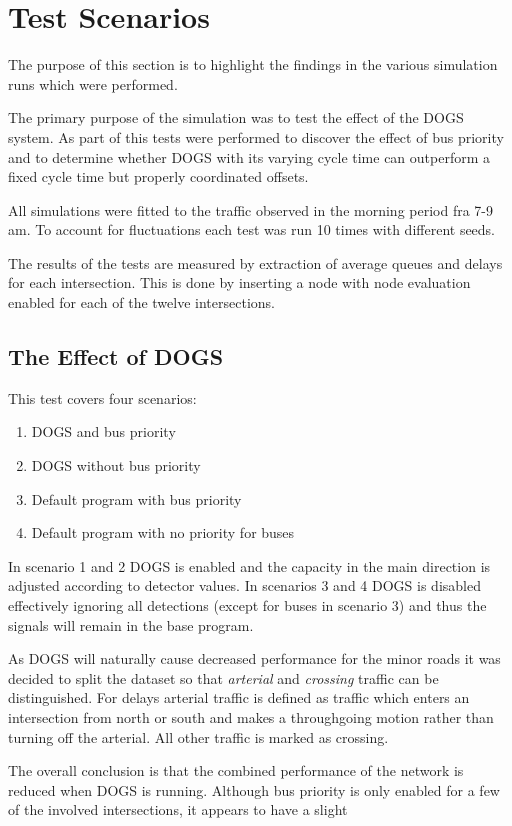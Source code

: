 \section{Test Scenarios}
The purpose of this section is to highlight the findings in the various simulation runs which were performed.

The primary purpose of the simulation was to test the effect of the DOGS system. 
As part of this tests were performed to discover the effect of bus priority and to determine whether DOGS with its varying cycle time can outperform a fixed cycle time but properly coordinated offsets.

All simulations were fitted to the traffic observed in the morning period fra 7-9 am.
To account for fluctuations each test was run 10 times with different seeds.

The results of the tests are measured by extraction of average queues and delays for each intersection. This is done by inserting a node with node evaluation enabled for each of the twelve intersections.

\subsection{The Effect of DOGS}
This test covers four scenarios:

\begin{enumerate}
\item DOGS and bus priority
\item DOGS without bus priority
\item Default program with bus priority
\item Default program with no priority for buses
\end{enumerate}

In scenario 1 and 2 DOGS is enabled and the capacity in the main direction is adjusted according to detector values. In scenarios 3 and 4 DOGS is disabled effectively ignoring all detections (except for buses in scenario 3) and thus the signals will remain in the base program.

As DOGS will naturally cause decreased performance for the minor roads it was decided to split the dataset so that \textit{arterial} and \textit{crossing} traffic can be distinguished. For delays arterial traffic is defined as traffic which enters an intersection from north or south and makes a throughgoing motion rather than turning off the arterial. All other traffic is marked as crossing.

The overall conclusion is that the combined performance of the network is reduced when DOGS is running. Although bus priority is only enabled for a few of the involved intersections, it appears to have a slight 

